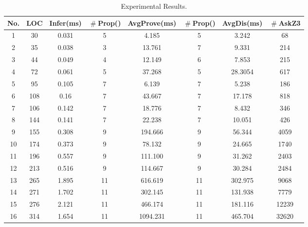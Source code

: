 \documentclass[acmsmall,10pt,review]{acmart}
\newcommand{\cmark}{\ding{51}}%
\newcommand{\xmark}{\ding{55}}%
\newcommand{\mysharp}{{\mathrel{\texttt{\#}}}}
\begin{document}
{\begin{table}[!ht]
\caption{\label{tab:Experimental} Experimental Results. }
\vspace{-2mm}
\centering
\renewcommand{\arraystretch}{1}
\begin{tabular} {c|c|c|c|c |c|c|c}
\hline
\textbf{No.} & \textbf{LOC} & \textbf{Infer(ms)} & \textbf{$\mysharp$Prop(\cmark)}   
& \textbf{Avg\text{-}Prove(ms)} & \textbf{$\mysharp$Prop(\xmark)}   & \textbf{Avg\text{-}Dis(ms)} &\textbf{$\mysharp$AskZ3} \\ \hline\hline
1    &    30    & 0.031  &  5     &  4.185   & 5   &  3.242  & 68 \\ \hline
2    &    35    & 0.038  &  3     &  13.761  & 7   &  9.331  & 214 \\ \hline
3    &    44    & 0.049  &  4     &  12.149  & 6   & 7.853   & 215 \\ \hline
4    &    72    & 0.061  &  5     &  37.268 & 5   & 28.3054 & 617 \\ \hline
5    &    95    & 0.105  &  7     &  6.139    & 7   &  5.238  & 186 \\ \hline
6    &    108   & 0.16   &  7     &  43.667    & 7   &  17.178  & 818 \\ \hline
7    &    106   & 0.142  &  7     &  18.776    & 7   &  8.432  & 346 \\ \hline
8    &    144   & 0.141  &  7     &  22.238    & 7   &  10.051  & 426 \\ \hline
9    &    155   & 0.308  &  9     &  194.666   & 9   &  56.344  & 4059 \\ \hline
10   &    174   & 0.373  &  9     &  78.132   & 9   &   24.665  & 1740 \\ \hline
11   &    196   & 0.557  &  9     &  111.100   & 9   &   31.262  & 2403 \\ \hline
12   &    213   & 0.516  &  9     &  114.667   & 9   &  30.284   & 2484 \\ \hline
13   &    265   & 1.895  &  11    & 616.619    & 11  &  302.975  & 9068 \\ \hline
14   &    271   & 1.702  &  11    &  302.145   & 11  &  131.938  & 7779 \\ \hline     
15   &    276   & 2.121 & 11     &  466.174  & 11  &   181.116  & 12239 \\ \hline
16   &    314   & 1.654 &  11    & 1094.231   & 11  &  465.704  & 32620 \\ \hline            
\end{tabular}
\end{table}

}
\end{document}
